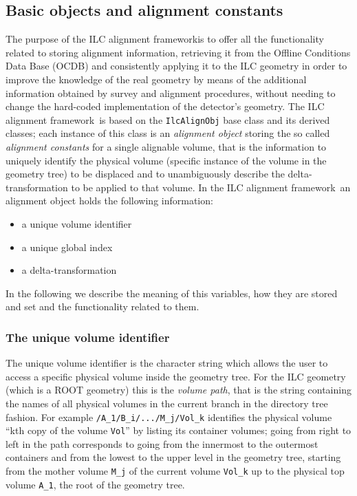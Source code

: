 \documentclass[12pt,a4paper,twoside]{article}
\makeatletter
\newcommand {\ROOT} {ROOT\@\xspace}
\newcommand{\FR}{ILC alignment framework}
\makeatother
\begin{document}
{\subsection{Basic objects and alignment constants}
The purpose of the \FR is to offer all the
functionality related to storing alignment information, retrieving it from
the Offline Conditions Data Base (OCDB) and consistently applying it to the
ILC geometry in order to improve the knowledge of the real geometry
by means of the additional information obtained by
survey and alignment procedures, without needing to change the
hard-coded implementation of the detector's geometry.
The \FR\ is based on the \lstinline{IlcAlignObj}
base class and its derived classes; each instance of this class is an
\emph{alignment object} storing the so called \emph{alignment
constants} for a single alignable volume, that is the information to
uniquely identify the physical volume (specific instance of the volume
in the geometry tree) to be displaced and to unambiguously describe the
delta-transformation to be applied to that volume. 
In the \FR\ an alignment object holds the
following information:
\begin{itemize}
  \item a unique volume identifier
  \item a unique global index
  \item a delta-transformation
\end{itemize}
In the following we describe the meaning of this variables, how they
are stored and set and the functionality related to them.

\subsubsection{The unique volume identifier}
The unique volume identifier is the character string which allows the user to
access a specific physical volume inside the geometry tree. For the
ILC geometry (which is a \ROOT geometry) this is the \emph{volume
path}, that is the string containing the names of all physical volumes
in the current branch in the directory tree fashion. For example
\lstinline!/A_1/B_i/.../M_j/Vol_k! identifies the physical volume ``kth
copy of the volume \lstinline!Vol!'' by listing its container volumes;
going from right to left in the path corresponds to going from the
innermost to the outermost containers and from the lowest to the upper
level in the geometry tree, starting from the mother volume
\lstinline!M_j! of the current volume \lstinline!Vol_k! up to the
physical top volume \lstinline!A_1!, the root of the geometry tree.

}
\end{document}
